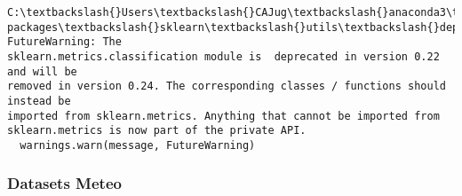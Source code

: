 \documentclass[11pt]{article}
\begin{document}
    \begin{Verbatim}[commandchars=\\\{\}]
C:\textbackslash{}Users\textbackslash{}CAJug\textbackslash{}anaconda3\textbackslash{}envs\textbackslash{}R\_py37\textbackslash{}lib\textbackslash{}site-
packages\textbackslash{}sklearn\textbackslash{}utils\textbackslash{}deprecation.py:143: FutureWarning: The
sklearn.metrics.classification module is  deprecated in version 0.22 and will be
removed in version 0.24. The corresponding classes / functions should instead be
imported from sklearn.metrics. Anything that cannot be imported from
sklearn.metrics is now part of the private API.
  warnings.warn(message, FutureWarning)
    \end{Verbatim}

    \hypertarget{datasets-meteo}{%
\subsubsection{Datasets Meteo}\label{datasets-meteo}}
\end{document}
